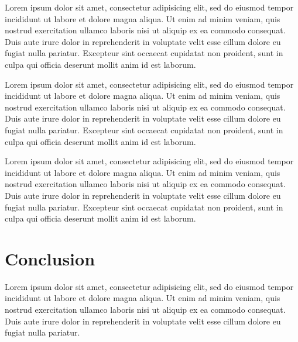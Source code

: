 \documentclass{article}
\begin{document}
Lorem ipsum dolor sit amet, consectetur adipisicing elit, sed do eiusmod tempor
incididunt ut labore et dolore magna aliqua. Ut enim ad minim veniam, quis
nostrud exercitation ullamco laboris nisi ut aliquip ex ea commodo consequat.
Duis aute irure dolor in reprehenderit in voluptate velit esse cillum dolore eu
fugiat nulla pariatur. Excepteur sint occaecat cupidatat non proident, sunt in
culpa qui officia deserunt mollit anim id est laborum.

Lorem ipsum dolor sit amet, consectetur adipisicing elit, sed do eiusmod tempor
incididunt ut labore et dolore magna aliqua. Ut enim ad minim veniam, quis
nostrud exercitation ullamco laboris nisi ut aliquip ex ea commodo consequat.
Duis aute irure dolor in reprehenderit in voluptate velit esse cillum dolore eu
fugiat nulla pariatur. Excepteur sint occaecat cupidatat non proident, sunt in
culpa qui officia deserunt mollit anim id est laborum.

Lorem ipsum dolor sit amet, consectetur adipisicing elit, sed do eiusmod tempor
incididunt ut labore et dolore magna aliqua. Ut enim ad minim veniam, quis
nostrud exercitation ullamco laboris nisi ut aliquip ex ea commodo consequat.
Duis aute irure dolor in reprehenderit in voluptate velit esse cillum dolore eu
fugiat nulla pariatur. Excepteur sint occaecat cupidatat non proident, sunt in
culpa qui officia deserunt mollit anim id est laborum.





\section{Conclusion}

Lorem ipsum dolor sit amet, consectetur adipisicing elit, sed do eiusmod tempor
incididunt ut labore et dolore magna aliqua. Ut enim ad minim veniam, quis
nostrud exercitation ullamco laboris nisi ut aliquip ex ea commodo consequat.
Duis aute irure dolor in reprehenderit in voluptate velit esse cillum dolore eu
fugiat nulla pariatur.


\listoffigures
\listoftables

{}
 
\end{document}
